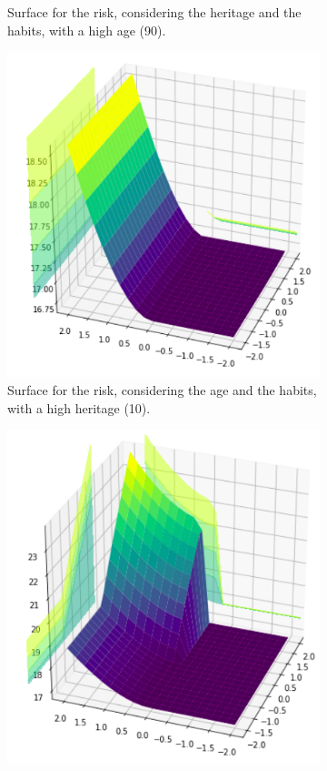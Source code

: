 \begin{figure}[ht]
\begin{subfigure}{.3\textwidth}
  \caption{Surface for the risk, considering the heritage and the habits, with a high age (90).}
  \label{fig:sur6}
\end{subfigure}
\begin{subfigure}{.3\textwidth}
  \centering
  \includegraphics[width=.8\linewidth]{figures/surfaces/age-habits10.png}
  \caption{Surface for the risk, considering the age and the habits, with a high heritage (10).}
  \label{fig:sur7}
\end{subfigure}
\hspace{10pts}
\begin{subfigure}{.3\textwidth}
  \centering
  \includegraphics[width=.8\linewidth]{figures/surfaces/age-habits5.png} 

\end{subfigure}
\end{figure}
